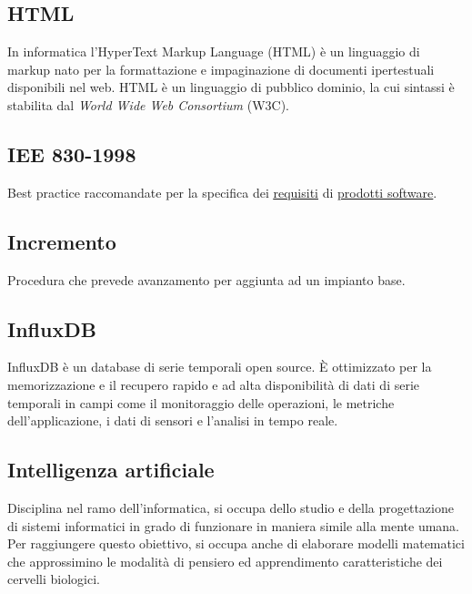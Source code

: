 	
	\subsection{HTML}
	\label{sec:html}
	In informatica l'HyperText Markup Language (HTML) è un linguaggio di markup  nato per la formattazione e impaginazione di documenti ipertestuali disponibili nel web. HTML è un linguaggio di pubblico dominio, la cui sintassi è stabilita dal \emph{World Wide Web Consortium} (W3C).
	


	\subsection{IEE 830-1998}
	\label{sec:iee830}
	Best practice raccomandate per la specifica dei \underline{\hyperref[sec:requisito]{requisiti}} di \underline{\hyperref[sec:prodottosoftware]{prodotti software}}. 
	
\subsection{Incremento}
\label{sec:incremento}
Procedura che prevede avanzamento per aggiunta ad un impianto base.

\subsection{InfluxDB}
\label{sec:influxdb}
InfluxDB è un database di serie temporali open source. È ottimizzato per la memorizzazione e il recupero rapido e ad alta disponibilità di dati di serie temporali in campi come il monitoraggio delle operazioni, le metriche dell'applicazione, i dati di sensori e l'analisi in tempo reale.

\subsection{Intelligenza artificiale}
\label{sec:ia}
Disciplina nel ramo dell'informatica, si occupa dello studio e della progettazione di sistemi informatici in grado di funzionare in maniera simile alla mente umana. Per raggiungere questo obiettivo, si occupa anche di elaborare modelli matematici che approssimino le modalità di pensiero ed apprendimento caratteristiche dei cervelli biologici. 


